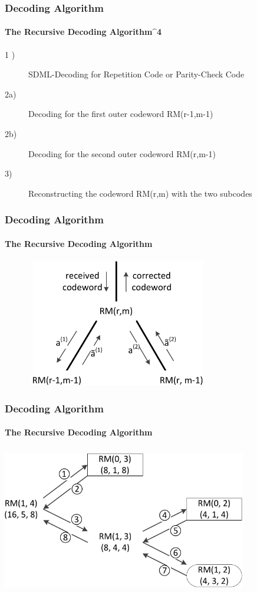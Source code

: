 \documentclass{beamer}
\begin{document}
\begin{frame}
	\frametitle{Decoding Algorithm}
	\framesubtitle{The Recursive Decoding Algorithm^{4}}
	\begin{description}
	\item [1 )]SDML-Decoding for Repetition Code or Parity-Check Code
	\end{description}
	\begin{description}
	\item [2a)]Decoding for the first outer codeword RM(r-1,m-1)
	\end{description}
	\begin{description}
	\item [2b)]Decoding for the second outer codeword RM(r,m-1)
	\end{description}
	\begin{description}
	\item [3)]Reconstructing the codeword RM(r,m) with the two subcodes
	\end{description}
\vspace{0.5cm}
\end{frame}

\begin{frame}
	\frametitle{Decoding Algorithm}
	\framesubtitle{The Recursive Decoding Algorithm}
	\vspace{0.5cm}
	\includegraphics[width=4.0in,height=2.2in]{GMC_node.pdf}
	\vspace{0.5cm}
\end{frame}

\begin{frame}
\frametitle{Decoding Algorithm}
\framesubtitle{The Recursive Decoding Algorithm}
	\vspace{0.5cm}
	\includegraphics[width=4.2in,height=2.5in]{Baum_RM14_Ablauf.pdf}
	\vspace{0.5cm}
\end{frame}
\end{document}
